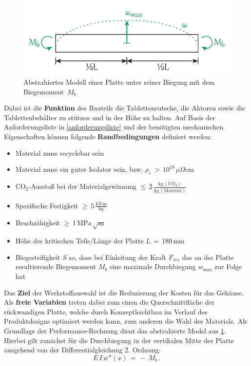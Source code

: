 \begin{figure}[H]
	\centering
	\includegraphics[width=0.8\linewidth]{chapter/Bilder/3_2}
	\caption{Abstrahiertes Modell einer Platte unter reiner Biegung mit dem Biegemoment~$M_b$}
	\label{fig:0301model}
\end{figure}
Dabei ist die \textbf{Funktion} des Bauteils die Tablettenrutsche, die Aktoren sowie die Tablettenbehälter zu stützen und in der Höhe zu halten. Auf Basis der Anforderungsliste in \ref{anforderungsliste} und der benötigten mechanischen Eigenschaften können folgende \textbf{Randbedingungen} definiert werden:
\begin{itemize}
	\item Material muss recyclebar sein
	\item Material muss ein guter Isolator sein, bzw. $\rho_e\,>\,10^{19}\,\mu\Omega$cm
	\item CO$_2$-Ausstoß bei der Materialgewinnung $\le\,2\,\frac{\text{kg}\,(\text{CO}_2)}{\text{kg}\,(\text{Material})}$
	\item Spezifische Festigkeit $\ge\,5\,\frac{\text{kN}\,\text{m}}{\text{kg}}$
	\item Bruchzähigkeit $\ge\,1\,\text{MPa}\,\sqrt{\text{m}}$
	\item Höhe des kritischen Teils/Länge der Platte $L\,=\,180\,$mm
	\item Biegesteifigkeit $S$ so, dass bei Einleitung der Kraft $F_{res}$ das an der Platte resultierende Biegemoment $M_b$ eine maximale Durchbiegung $w_{\text{max}}$ zur Folge hat
\end{itemize}
Das \textbf{Ziel} der Werkstoffauswahl ist die Reduzierung der Kosten für das Gehäuse. Als \textbf{freie Variablen} treten dabei zum einen die Querschnittfläche der rückwandigen Platte, welche durch Konzeptleichtbau im Verlauf des Produktdesigns optimiert werden kann, zum anderen die Wahl des Materials.
Als Grundlage der Performance-Rechnung dient das abstrahierte Model aus \ref{fig:0301model}. Hierbei gilt zunächst für die Durchbiegung in der vertikalen Mitte der Platte ausgehend von der Differentialgleichung 2. Ordnung:
\begin{equation}
	E\,I\,w''(x)\,=\,-\,M_b\,.
\end{equation}
